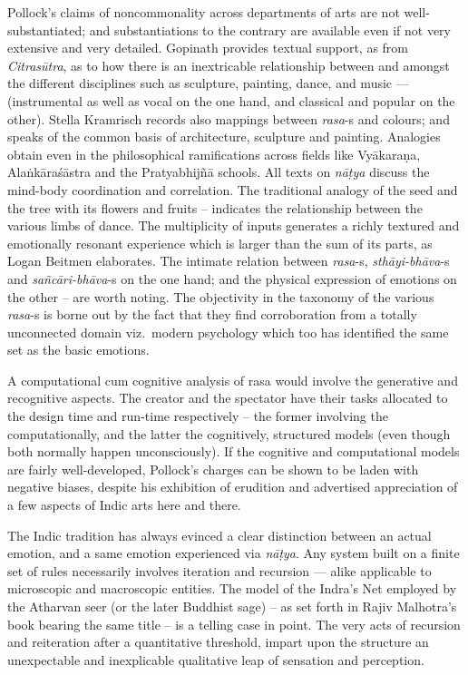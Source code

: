 Pollock’s claims of noncommonality across departments of arts are not well-substantiated; and substantiations to the contrary are available even if not very extensive and very detailed. Gopinath provides textual support, as from \textsl{Citrasūtra}, as to how there is an inextricable relationship between and amongst the different disciplines such as sculpture, painting, dance, and music --- (instrumental as well as vocal on the one hand, and classical and popular on the other). Stella Kramrisch records also mappings between \textsl{rasa}-s and colours; and speaks of the common basis of architecture, sculpture and painting. Analogies obtain even in the philosophical ramifications across fields like Vyākaraṇa, Alaṅkāraśāstra and the Pratyabhijñā schools. All texts on \textsl{nāṭya} discuss the mind-body coordination and correlation. The traditional analogy of the seed and the tree with its flowers and fruits -- indicates the relationship between the various limbs of dance. The multiplicity of inputs generates a richly textured and emotionally resonant experience which is larger than the sum of its parts, as Logan Beitmen elaborates. The intimate relation between \textsl{rasa}-s, \textsl{sthāyi-bhāva}-s and \textsl{sañcāri-bhāva}-s on the one hand; and the physical expression of emotions on the other -- are worth noting. The objectivity in the taxonomy of the various \textsl{rasa}-s is borne out by the fact that they find corroboration from a totally unconnected domain viz.\ modern psychology which too has identified the same set as the basic emotions.
\newpage

A computational cum cognitive analysis of rasa would involve the generative and recognitive aspects. The creator and the spectator have their tasks allocated to the design time and run-time respectively -- the former involving the computationally, and the latter the cognitively, structured models (even though both normally happen unconsciously). If the cognitive and computational models are fairly well-developed,  Pollock’s charges can be shown to be laden with negative biases, despite his exhibition of erudition and advertised appreciation of a few aspects of Indic arts here and there.

The Indic tradition has always evinced a clear distinction between an actual emotion, and a same emotion experienced via \textsl{nāṭya}. Any system built on a finite set of rules necessarily involves iteration and recursion --- alike applicable to microscopic and macroscopic entities. The model of the Indra’s Net employed by the Atharvan seer (or the later Buddhist sage) -- as set forth in Rajiv Malhotra’s book bearing the same title -- is a telling case in point. The very acts of recursion and reiteration after a quantitative threshold, impart upon the structure an unexpectable and inexplicable qualitative leap of sensation and perception.

